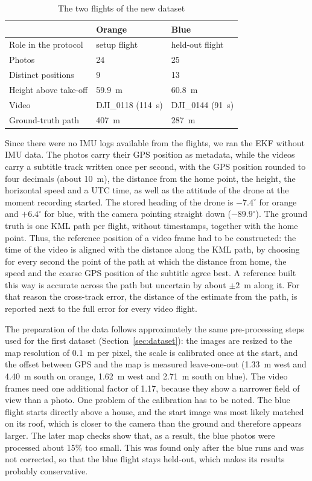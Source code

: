 \documentclass[english, Lau, oneside]{sapthesis}%
\begin{document}
\begin{table}[!htbp]
  \centering
  \caption{The two flights of the new dataset}
  \label{tab:real-flights}
  \small
  \begin{tabular}{lll}
    \toprule
     & Orange & Blue \\
    \midrule
    Role in the protocol & setup flight & held-out flight \\
    Photos & 24 & 25 \\
    Distinct positions & 9 & 13 \\
    Height above take-off & 59.9~m & 60.8~m \\
    Video & DJI\_0118 (114~s) & DJI\_0144 (91~s) \\
    Ground-truth path & 407~m & 287~m \\
    \bottomrule
  \end{tabular}
\end{table}

Since there were no IMU logs available from the flights, we ran the EKF without IMU data. The photos carry their GPS position as metadata, while the videos carry a subtitle track written once per second, with the GPS position rounded to four decimals (about 10~m), the distance from the home point, the height, the horizontal speed and a UTC time, as well as the attitude of the drone at the moment recording started. The stored heading of the drone is $-7.4^\circ$ for orange and $+6.4^\circ$ for blue, with the camera pointing straight down ($-89.9^\circ$). The ground truth is one KML path per flight, without timestamps, together with the home point. Thus, the reference position of a video frame had to be constructed: the time of the video is aligned with the distance along the KML path, by choosing for every second the point of the path at which the distance from home, the speed and the coarse GPS position of the subtitle agree best. A reference built this way is accurate across the path but uncertain by about $\pm 2$~m along it. For that reason the cross-track error, the distance of the estimate from the path, is reported next to the full error for every video flight.

The preparation of the data follows approximately the same pre-processing steps used for the first dataset (Section~\ref{sec:dataset}): the images are resized to the map resolution of 0.1~m per pixel, the scale is calibrated once at the start, and the offset between GPS and the map is measured leave-one-out (1.33~m west and 4.40~m south on orange, 1.62~m west and 2.71~m south on blue). The video frames need one additional factor of 1.17, because they show a narrower field of view than a photo. One problem of the calibration has to be noted. The blue flight starts directly above a house, and the start image was most likely matched on its roof, which is closer to the camera than the ground and therefore appears larger. The later map checks show that, as a result, the blue photos were processed about 15\% too small. This was found only after the blue runs and was not corrected, so that the blue flight stays held-out, which makes its results probably conservative.
\end{document}
